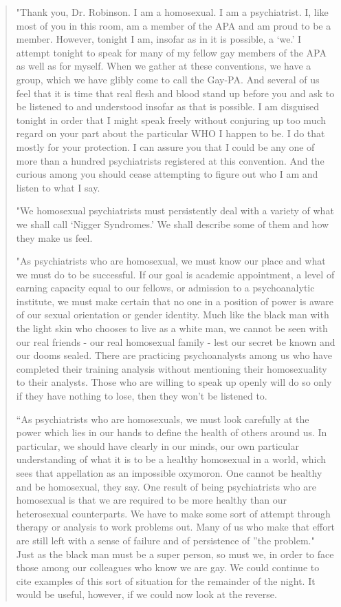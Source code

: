 \begin{quote}

"Thank you, Dr. Robinson. I am a homosexual. I am a psychiatrist. I, like most of you in this room, am a member of the APA and am proud to be a member. However, tonight I am, insofar as in it is possible, a `we.' I attempt tonight to speak for many of my fellow gay members of the APA as well as for myself. When we gather at these conventions, we have a group, which we have glibly come to call the Gay-PA. And several of us feel that it is time that real flesh and blood stand up before you and ask to be listened to and understood insofar as that is possible. I am disguised tonight in order that I might speak freely without conjuring up too much regard on your part about the particular WHO I happen to be. I do that mostly for your protection. I can assure you that I could be any one of more than a hundred psychiatrists registered at this convention. And the curious among you should cease attempting to figure out who I am and listen to what I say.

"We homosexual psychiatrists must persistently deal with a variety of what we shall call `Nigger Syndromes.' We shall describe some of them and how they make us feel.

"As psychiatrists who are homosexual, we must know our place and what we must do to be successful. If our goal is academic appointment, a level of earning capacity equal to our fellows, or admission to a psychoanalytic institute, we must make certain that no one in a position of power is aware of our sexual orientation or gender identity. Much like the black man with the light skin who chooses to live as a white man, we cannot be seen with our real friends - our real homosexual family - lest our secret be known and our dooms sealed. There are practicing psychoanalysts among us who have completed their training analysis without mentioning their homosexuality to their analysts. Those who are willing to speak up openly will do so only if they have nothing to lose, then they won't be listened to.

``As psychiatrists who are homosexuals, we must look carefully at the power which lies in our hands to define the health of others around us. In particular, we should have clearly in our minds, our own particular understanding of what it is to be a healthy homosexual in a world, which sees that appellation as an impossible oxymoron. One cannot be healthy and be homosexual, they say. One result of being psychiatrists who are homosexual is that we are required to be more healthy than our heterosexual counterparts. We have to make some sort of attempt through therapy or analysis to work problems out. Many of us who make that effort are still left with a sense of failure and of persistence of ''the problem." Just as the black man must be a super person, so must we, in order to face those among our colleagues who know we are gay. We could continue to cite examples of this sort of situation for the remainder of the night. It would be useful, however, if we could now look at the reverse.


\end{quote}
